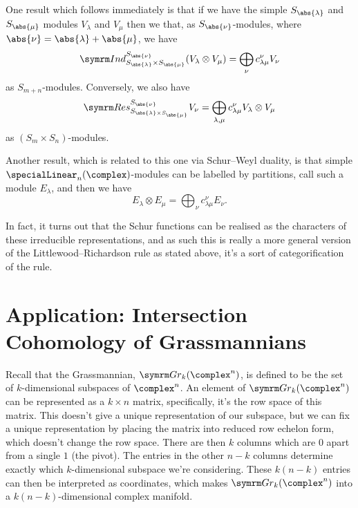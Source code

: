 One result which follows immediately is that if we have the simple \(S_{\abs{\lambda}}\) and \(S_{\abs{\mu}}\) modules \(V_\lambda\) and \(V_\mu\) then we that, as \(S_{\abs{\nu}}\)-modules, where \(\abs{\nu} = \abs{\lambda} + \abs{\mu}\), we have
\begin{equation}
    \Ind^{S_{\abs{\nu}}}_{S_{\abs{\lambda}} \times S_{\abs{\mu}}} (V_\lambda \otimes V_\mu) = \bigoplus_{\nu} c^\nu_{\lambda\mu} V_\nu
\end{equation}
as \(S_{m + n}\)-modules.
Conversely, we also have
\begin{equation}
    \Res^{S_{\abs{\nu}}}_{S_{\abs{\lambda} \times S_{\abs{\mu}}}} V_\nu = \bigoplus_{\lambda,\mu} c^\nu_{\lambda\mu} V_\lambda \otimes V_\mu
\end{equation}
as \((S_m \times S_n)\)-modules.

Another result, which is related to this one via Schur--Weyl duality, is that simple \(\specialLinear_n(\complex)\)-modules can be labelled by partitions, call such a module \(E_\lambda\), and then we have
\begin{equation}
    E_\lambda \otimes E_\mu = \bigoplus_{\nu} c^\nu_{\lambda\mu}E_\nu.
\end{equation}

In fact, it turns out that the Schur functions can be realised as the characters of these irreducible representations, and as such this is really a more general version of the Littlewood--Richardson rule as stated above, it's a sort of categorification of the rule.

\section{Application: Intersection Cohomology of Grassmannians}
Recall that the Grassmannian, \(\Gr_k(\complex^n)\), is defined to be the set of \(k\)-dimensional subspaces of \(\complex^n\).
An element of \(\Gr_k(\complex^n)\) can be represented as a \(k \times n\) matrix, specifically, it's the row space of this matrix.
This doesn't give a unique representation of our subspace, but we can fix a unique representation by placing the matrix into reduced row echelon form, which doesn't change the row space.
There are then \(k\) columns which are \(0\) apart from a single \(1\) (the pivot).
The entries in the other \(n - k\) columns determine exactly which \(k\)-dimensional subspace we're considering.
These \(k(n-k)\) entries can then be interpreted as coordinates, which makes \(\Gr_k(\complex^n)\) into a \(k(n - k)\)-dimensional complex manifold.


